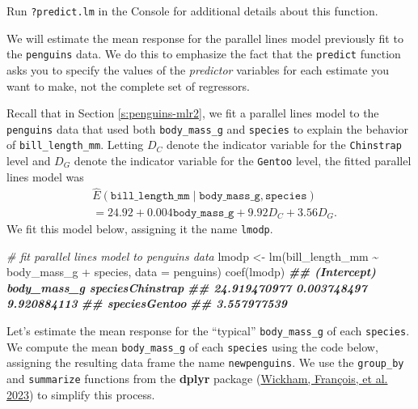\documentclass[
]{book}
\newenvironment{Shaded}{\begin{snugshade}}{\end{snugshade}}
\newcommand{\AttributeTok}[1]{\textcolor[rgb]{0.77,0.63,0.00}{#1}}
\newcommand{\CommentTok}[1]{\textcolor[rgb]{0.56,0.35,0.01}{\textit{#1}}}
\newcommand{\DocumentationTok}[1]{\textcolor[rgb]{0.56,0.35,0.01}{\textbf{\textit{#1}}}}
\newcommand{\FunctionTok}[1]{\textcolor[rgb]{0.00,0.00,0.00}{#1}}
\newcommand{\NormalTok}[1]{#1}
\newcommand{\OtherTok}[1]{\textcolor[rgb]{0.56,0.35,0.01}{#1}}
\newcommand{\SpecialCharTok}[1]{\textcolor[rgb]{0.00,0.00,0.00}{#1}}
\theoremstyle{definition}
\theoremstyle{definition}
\theoremstyle{definition}
\theoremstyle{definition}
\theoremstyle{remark}
\begin{document}
Run \texttt{?predict.lm} in the Console for additional details about this
function.

We will estimate the mean response for the parallel lines model
previously fit to the \texttt{penguins} data. We do this to emphasize the fact
that the \texttt{predict} function asks you to specify the values of the
\emph{predictor} variables for each estimate you want to make, not the
complete set of regressors.

Recall that in Section \ref{s:penguins-mlr2}, we fit a parallel lines
model to the \texttt{penguins} data that used both \texttt{body\_mass\_g} and \texttt{species}
to explain the behavior of \texttt{bill\_length\_mm}. Letting \(D_C\) denote the
indicator variable for the \texttt{Chinstrap} level and \(D_G\) denote the
indicator variable for the \texttt{Gentoo} level, the fitted parallel lines
model was \[
\begin{aligned}
&\hat{E}(\mathtt{bill\_length\_mm} \mid \mathtt{body\_mass\_g}, \mathtt{species})\\
&= 24.92 + 0.004 \mathtt{body\_mass\_g} + 9.92 D_C + 3.56 D_G.
\end{aligned}
\] We fit this model below, assigning it the name \texttt{lmodp}.

\begin{Shaded}
\begin{Highlighting}[]
\CommentTok{\# fit parallel lines model to penguins data}
\NormalTok{lmodp }\OtherTok{\textless{}{-}} \FunctionTok{lm}\NormalTok{(bill\_length\_mm }\SpecialCharTok{\textasciitilde{}}\NormalTok{ body\_mass\_g }\SpecialCharTok{+}\NormalTok{ species,}
            \AttributeTok{data =}\NormalTok{ penguins)}
\FunctionTok{coef}\NormalTok{(lmodp)}
\DocumentationTok{\#\#      (Intercept)      body\_mass\_g speciesChinstrap }
\DocumentationTok{\#\#     24.919470977      0.003748497      9.920884113 }
\DocumentationTok{\#\#    speciesGentoo }
\DocumentationTok{\#\#      3.557977539}
\end{Highlighting}
\end{Shaded}

Let's estimate the mean response for the ``typical'' \texttt{body\_mass\_g} of each \texttt{species}. We compute the mean \texttt{body\_mass\_g} of each \texttt{species} using the code below, assigning the resulting data frame the name \texttt{newpenguins}. We use the \texttt{group\_by} and \texttt{summarize} functions from the \textbf{dplyr} package (\protect\hyperlink{ref-R-dplyr}{Wickham, François, et al. 2023}) to simplify this process.
\end{document}
